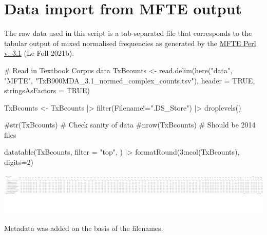 \documentclass[
  letterpaper,
  DIV=11,
  numbers=noendperiod]{scrreprt}
\newenvironment{Shaded}{\begin{snugshade}}{\end{snugshade}}
\newcommand{\AttributeTok}[1]{\textcolor[rgb]{0.40,0.45,0.13}{#1}}
\newcommand{\CommentTok}[1]{\textcolor[rgb]{0.37,0.37,0.37}{#1}}
\newcommand{\ConstantTok}[1]{\textcolor[rgb]{0.56,0.35,0.01}{#1}}
\newcommand{\DecValTok}[1]{\textcolor[rgb]{0.68,0.00,0.00}{#1}}
\newcommand{\FunctionTok}[1]{\textcolor[rgb]{0.28,0.35,0.67}{#1}}
\newcommand{\NormalTok}[1]{\textcolor[rgb]{0.00,0.23,0.31}{#1}}
\newcommand{\OtherTok}[1]{\textcolor[rgb]{0.00,0.23,0.31}{#1}}
\newcommand{\SpecialCharTok}[1]{\textcolor[rgb]{0.37,0.37,0.37}{#1}}
\newcommand{\StringTok}[1]{\textcolor[rgb]{0.13,0.47,0.30}{#1}}
\begin{document}
\section{Data import from MFTE
output}\label{data-import-from-mfte-output}

The raw data used in this script is a tab-separated file that
corresponds to the tabular output of mixed normalised frequencies as
generated by the
\href{https://github.com/mshakirDr/MultiFeatureTaggerEnglish}{MFTE Perl
v. 3.1} (Le Foll 2021b).

\begin{Shaded}
\begin{Highlighting}[]
\CommentTok{\# Read in Textbook Corpus data}
\NormalTok{TxBcounts }\OtherTok{\textless{}{-}} \FunctionTok{read.delim}\NormalTok{(}\FunctionTok{here}\NormalTok{(}\StringTok{"data"}\NormalTok{, }\StringTok{"MFTE"}\NormalTok{, }\StringTok{"TxB900MDA\_3.1\_normed\_complex\_counts.tsv"}\NormalTok{), }\AttributeTok{header =} \ConstantTok{TRUE}\NormalTok{, }\AttributeTok{stringsAsFactors =} \ConstantTok{TRUE}\NormalTok{)}

\NormalTok{TxBcounts }\OtherTok{\textless{}{-}}\NormalTok{ TxBcounts }\SpecialCharTok{|\textgreater{}} 
  \FunctionTok{filter}\NormalTok{(Filename}\SpecialCharTok{!=}\StringTok{".DS\_Store"}\NormalTok{) }\SpecialCharTok{|\textgreater{}}  
  \FunctionTok{droplevels}\NormalTok{()}

\CommentTok{\#str(TxBcounts) \# Check sanity of data}
\CommentTok{\#nrow(TxBcounts) \# Should be 2014 files}

\FunctionTok{datatable}\NormalTok{(TxBcounts,}
  \AttributeTok{filter =} \StringTok{"top"}\NormalTok{,}
\NormalTok{) }\SpecialCharTok{|\textgreater{}} 
  \FunctionTok{formatRound}\NormalTok{(}\DecValTok{3}\SpecialCharTok{:}\FunctionTok{ncol}\NormalTok{(TxBcounts), }\AttributeTok{digits=}\DecValTok{2}\NormalTok{)}
\end{Highlighting}
\end{Shaded}

\includegraphics{AppendixE_files/figure-pdf/raw_data-1.pdf}

Metadata was added on the basis of the filenames.
\end{document}
